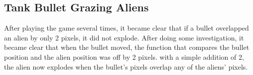 \documentclass[11pt,letter,oneside]{report}
\begin{document}
\subsection{Tank Bullet Grazing Aliens}
After playing the game several times, it became clear that if a bullet overlapped an alien by only 2 pixels, it did not explode. After doing some investigation, it became clear that when the bullet moved, the function that compares the bullet position and the alien position was off by 2 pixels. with a simple addition of 2, the alien now explodes when the bullet's pixels overlap any of the aliens' pixels.
\end{document}
